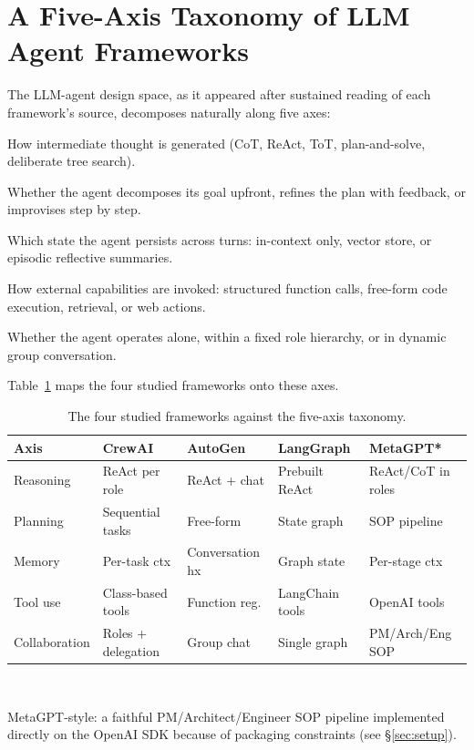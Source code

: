 \documentclass[conference]{IEEEtran}
\begin{document}
\section{A Five-Axis Taxonomy of LLM Agent Frameworks}
The LLM-agent design space, as it appeared after sustained reading of
each framework's source, decomposes naturally along five axes:
\begin{description}[leftmargin=1.2em,style=nextline]
\item[Reasoning] How intermediate thought is generated (CoT, ReAct,
ToT, plan-and-solve, deliberate tree search).
\item[Planning] Whether the agent decomposes its goal upfront, refines
the plan with feedback, or improvises step by step.
\item[Memory] Which state the agent persists across turns: in-context
only, vector store, or episodic reflective summaries.
\item[Tool use] How external capabilities are invoked: structured
function calls, free-form code execution, retrieval, or web actions.
\item[Collaboration] Whether the agent operates alone, within a fixed
role hierarchy, or in dynamic group conversation.
\end{description}

Table~\ref{tab:tax} maps the four studied frameworks onto these axes.

\begin{table}[t]
\caption{The four studied frameworks against the five-axis taxonomy.}
\label{tab:tax}
\centering
\footnotesize
\setlength{\tabcolsep}{4pt}
\begin{tabularx}{\columnwidth}{lXXXX}
\toprule
\textbf{Axis} & \textbf{CrewAI} & \textbf{AutoGen} & \textbf{LangGraph} & \textbf{MetaGPT*} \\
\midrule
Reasoning      & ReAct per role        & ReAct + chat       & Prebuilt ReAct  & ReAct/CoT in roles \\
Planning       & Sequential tasks      & Free-form          & State graph     & SOP pipeline \\
Memory         & Per-task ctx          & Conversation hx    & Graph state     & Per-stage ctx \\
Tool use       & Class-based tools     & Function reg.      & LangChain tools & OpenAI tools \\
Collaboration  & Roles + delegation    & Group chat         & Single graph    & PM/Arch/Eng SOP \\
\bottomrule
\end{tabularx}
\vspace{2pt}
\\\raggedright\scriptsize *MetaGPT-style: a faithful PM/Architect/Engineer
SOP pipeline implemented directly on the OpenAI SDK because of
packaging constraints (see \S\ref{sec:setup}).
\end{table}
\end{document}
